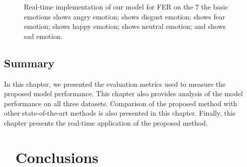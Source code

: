 \documentclass[master]{thesis-uestc}
\begin{document}
\begin{figure}
%
\hspace{8pt}%

\caption[Real-time implementation of the model for FER on the 7 the basic emotions]{Real-time implementation of our model for FER on the 7 the basic emotions
 shows angry emotion;
 shows disgust emotion;
 shows fear emotion;
 shows happy emotion;
 shows neutral emotion; and
 shows sad emotion.}
\label{fig:implementation}%
\end{figure}

\section{Summary}
In this chapter, we presented the evaluation metrics used to measure the proposed model performance. This chapter also provides analysis of the model performance on all three datasets. Comparison of the proposed method with other state-of-the-art methods is also presented in this chapter. Finally, this chapter presents the real-time application of the proposed method. 

\chapter{\,\,\,\,\,\textbf{Conclusions}}
\end{document}
